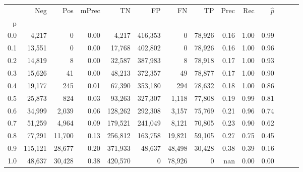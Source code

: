 \begin{tabular}{rrrrrrrrrrrrrr}
\toprule
{} &      Neg &     Pos & mPrec &       TN &       FP &      FN &      TP &  Prec &   Rec & $\hat{p}$ \\
p   &          &         &       &          &          &         &         &       &       &           \\
\midrule
0.0 &    4,217 &       0 &  0.00 &    4,217 &  416,353 &       0 &  78,926 &  0.16 &  1.00 &      0.99 \\
0.1 &   13,551 &       0 &  0.00 &   17,768 &  402,802 &       0 &  78,926 &  0.16 &  1.00 &      0.96 \\
0.2 &   14,819 &       8 &  0.00 &   32,587 &  387,983 &       8 &  78,918 &  0.17 &  1.00 &      0.93 \\
0.3 &   15,626 &      41 &  0.00 &   48,213 &  372,357 &      49 &  78,877 &  0.17 &  1.00 &      0.90 \\
0.4 &   19,177 &     245 &  0.01 &   67,390 &  353,180 &     294 &  78,632 &  0.18 &  1.00 &      0.86 \\
0.5 &   25,873 &     824 &  0.03 &   93,263 &  327,307 &   1,118 &  77,808 &  0.19 &  0.99 &      0.81 \\
0.6 &   34,999 &   2,039 &  0.06 &  128,262 &  292,308 &   3,157 &  75,769 &  0.21 &  0.96 &      0.74 \\
0.7 &   51,259 &   4,964 &  0.09 &  179,521 &  241,049 &   8,121 &  70,805 &  0.23 &  0.90 &      0.62 \\
0.8 &   77,291 &  11,700 &  0.13 &  256,812 &  163,758 &  19,821 &  59,105 &  0.27 &  0.75 &      0.45 \\
0.9 &  115,121 &  28,677 &  0.20 &  371,933 &   48,637 &  48,498 &  30,428 &  0.38 &  0.39 &      0.16 \\
1.0 &   48,637 &  30,428 &  0.38 &  420,570 &        0 &  78,926 &       0 &   nan &  0.00 &      0.00 \\
\bottomrule
\end{tabular}
